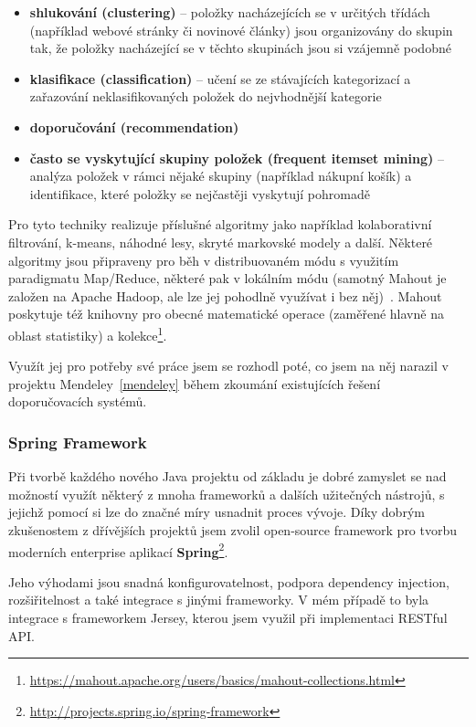 \documentclass[thesis=M,czech]{FITthesis}[2014/05/07]
\begin{document}
\begin{itemize}
	\item \textbf{shlukování (clustering)} – položky nacházejících se v určitých třídách (například webové stránky či novinové články) jsou organizovány do skupin tak, že položky nacházející se v těchto skupinách jsou si vzájemně podobné
	\item \textbf{klasifikace (classification)} – učení se ze stávajících kategorizací a zařazování neklasifikovaných položek do nejvhodnější kategorie
	\item \textbf{doporučování (recommendation)}
	\item \textbf{často se vyskytující skupiny položek (frequent itemset mining)} – analýza položek v rámci nějaké skupiny (například nákupní košík) a identifikace, které položky se nejčastěji vyskytují pohromadě
\end{itemize}

Pro tyto techniky realizuje příslušné algoritmy jako například kolaborativní filtrování, k-means, náhodné lesy, skryté markovské modely a další. Některé algoritmy jsou připraveny pro běh v distribuovaném módu s využitím paradigmatu Map/Reduce, některé pak v lokálním módu (samotný Mahout je založen na Apache Hadoop, ale lze jej pohodlně využívat i bez něj)~\cite{mahouttut}. Mahout poskytuje též knihovny pro obecné matematické operace (zaměřené hlavně na oblast statistiky) a kolekce\footnote{\url{https://mahout.apache.org/users/basics/mahout-collections.html}}. 

Využít jej pro potřeby své práce jsem se rozhodl poté, co jsem na něj narazil v projektu Mendeley~\ref{mendeley} během zkoumání existujících řešení doporučovacích systémů. 

\subsubsection{Spring Framework}
Při tvorbě každého nového Java projektu od základu je dobré zamyslet se nad možností využít některý z mnoha frameworků a dalších užitečných nástrojů, s jejichž pomocí si lze do značné míry usnadnit proces vývoje. Díky dobrým zkušenostem z dřívějších projektů jsem zvolil open-source framework pro tvorbu moderních enterprise aplikací \textbf{Spring}\footnote{\url{http://projects.spring.io/spring-framework}}. 

Jeho výhodami jsou snadná konfigurovatelnost, podpora dependency injection, rozšiřitelnost a také integrace s jinými frameworky. V mém případě to byla integrace s frameworkem Jersey, kterou jsem využil při implementaci RESTful API.
\end{document}
